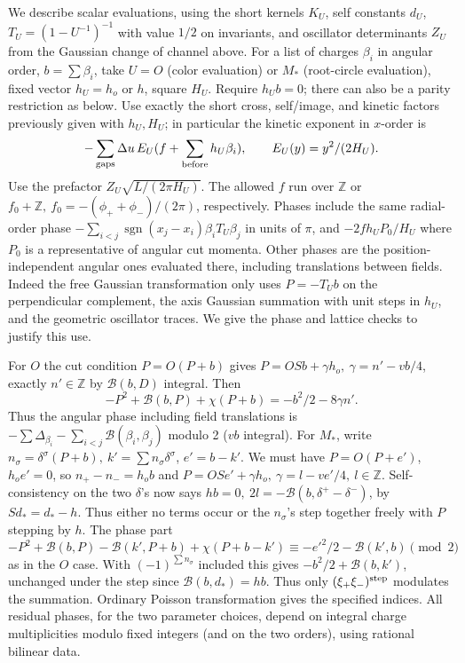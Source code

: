\documentclass[11pt]{article}
\numberwithin{equation}{section}
\theoremstyle{definition}\newtheorem{definition}[theorem]{Definition}
\theoremstyle{remark}\newtheorem{remark}[theorem]{Remark}
\begin{document}
We describe scalar evaluations, using the short kernels \(K_U\), self constants \(d_U\), \(T_U=(1-U^{-1})^{-1}\) with value \(1/2\) on invariants, and oscillator determinants \(Z_U\) from the Gaussian change of channel above. For a list of charges \(\beta_i\) in angular order, \(b=\sum\beta_i\), take \(U=O\) (color evaluation) or \(M_*\) (root-circle evaluation), fixed vector \(h_U=h_o\) or \(h\), square \(H_U\). Require \(h_U b=0\); there can also be a parity restriction as below. Use exactly the short cross, self/image, and kinetic factors previously given with \(h_U,H_U\); in particular the kinetic exponent in \(x\)-order is
\[
 -\sum_{\rm gaps}\Delta u\, E_U(f+\sum_{\rm before} h_U\beta_i),\qquad
 E_U(y)=y^2/(2H_U).
\]
Use the prefactor \(Z_U\sqrt{L/(2\pi H_U)}\). The allowed \(f\) run over \(\mathbb Z\) or \(f_0+\mathbb Z,\ f_0=-(\phi_++\phi_-)/(2\pi)\), respectively. Phases include the same radial-order phase \(-\sum_{i<j}\operatorname{sgn}(x_j-x_i)\beta_i T_U\beta_j\) in units of \(\pi\), and \(-2 f h_U P_0/H_U\) where \(P_0\) is a representative of angular cut momenta. Other phases are the position-independent angular ones evaluated there, including translations between fields. Indeed the free Gaussian transformation only uses \(P=-T_U b\) on the perpendicular complement, the axis Gaussian summation with unit steps in \(h_U\), and the geometric oscillator traces. We give the phase and lattice checks to justify this use.

For \(O\) the cut condition \(P=O(P+b)\) gives \(P=OS b+\gamma h_o,\ \gamma=n'-vb/4\), exactly \(n'\in\mathbb Z\) by \(\mathcal B(b,D)\) integral. Then
\[
 -P^2+\mathcal B(b,P)+\chi(P+b)=-b^2/2-8\gamma n' .
\]
Thus the angular phase including field translations is \(-\sum\Delta_{\beta_i}-\sum_{i<j}\mathcal B(\beta_i,\beta_j)\) modulo 2 (\(vb\) integral). For \(M_*\), write \(n_\sigma=\delta^\sigma(P+b),\ k'=\sum n_\sigma\delta^\sigma\), \(e'=b-k'\). We must have \(P=O(P+e')\), \(h_o e'=0\), so \(n_+-n_-=h_o b\) and \(P=OS e'+\gamma h_o,\ \gamma=l-v e'/4,\ l\in\mathbb Z\). Self-consistency on the two \(\delta\)'s now says \(h b=0,\ 2l=-\mathcal B(b,\delta^+-\delta^-)\), by \(S d_*=d_*-h\). Thus either no terms occur or the \(n_\sigma\)'s step together freely with \(P\) stepping by \(h\). The phase part
\[
 -P^2+\mathcal B(b,P)-\mathcal B(k',P+b)+\chi(P+b-k')
    \equiv -{e'}^2/2-\mathcal B(k',b)\pmod 2
\]
as in the \(O\) case. With \((-1)^{\sum n_\sigma}\) included this gives \(-b^2/2+\mathcal B(b,k')\), unchanged under the step since \(\mathcal B(b,d_*)=hb\). Thus only \((\xi_+\xi_-)^{\rm step}\) modulates the summation. Ordinary Poisson transformation gives the specified indices. All residual phases, for the two parameter choices, depend on integral charge multiplicities modulo fixed integers (and on the two orders), using rational bilinear data.
\end{document}
